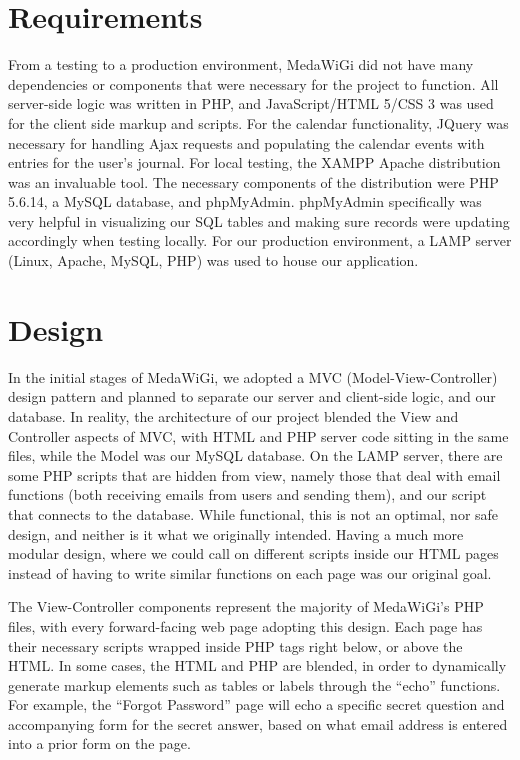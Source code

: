 \documentclass[twocolumn,12pt]{article}
\begin{document}
\section{Requirements}
From a testing to a production environment, MedaWiGi did not have many dependencies or components that were necessary for the project to function. All server-side logic was written in PHP, and JavaScript/HTML 5/CSS 3 was used for the client side markup and scripts. For the calendar functionality, JQuery was necessary for handling Ajax requests and populating the calendar events with entries for the user’s journal. For local testing, the XAMPP Apache distribution was an invaluable tool. The necessary components of the distribution were PHP 5.6.14, a MySQL database, and phpMyAdmin. phpMyAdmin specifically was very helpful in visualizing our SQL tables and making sure records were updating accordingly when testing locally. For our production environment, a LAMP server (Linux, Apache, MySQL, PHP) was used to house our application.

\section{Design}
In the initial stages of MedaWiGi, we adopted a MVC (Model-View-Controller) design pattern and planned to separate our server and client-side logic, and our database. In reality, the architecture of our project blended the View and Controller aspects of MVC, with HTML and PHP server code sitting in the same files, while the Model was our MySQL database. On the LAMP server, there are some PHP scripts that are hidden from view, namely those that deal with email functions (both receiving emails from users and sending them), and our script that connects to the database. While functional, this is not an optimal, nor safe design, and neither is it what we originally intended. Having a much more modular design, where we could call on different scripts inside our HTML pages instead of having to write similar functions on each page was our original goal. 

The View-Controller components represent the majority of MedaWiGi’s PHP files, with every forward-facing web page adopting this design. Each page has their necessary scripts wrapped inside PHP tags right below, or above the HTML. In some cases, the HTML and PHP are blended, in order to dynamically generate markup elements such as tables or labels through the “echo” functions. For example, the “Forgot Password” page will echo a specific secret question and accompanying form for the secret answer, based on what email address is entered into a prior form on the page.
\end{document}

